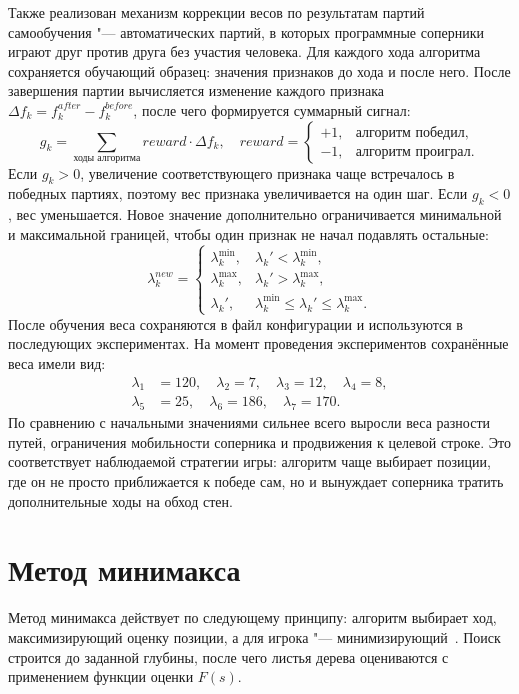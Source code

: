 \documentclass{csmathnotes}
\begin{document}
Также реализован механизм коррекции весов по результатам партий самообучения "--- автоматических партий, в которых программные соперники играют друг против друга без участия человека. Для каждого хода алгоритма сохраняется обучающий образец: значения признаков до хода и после него. После завершения партии вычисляется изменение каждого признака $\Delta f_k = f_k^{\textit{after}} - f_k^{\textit{before}}$, после чего формируется суммарный сигнал:
\[
g_k = \sum_{\text{ходы алгоритма}} \textit{reward} \cdot \Delta f_k,
\quad
\textit{reward} =
\begin{cases}
+1, & \text{алгоритм победил}, \\
-1, & \text{алгоритм проиграл}.
\end{cases}
\]
Если $g_k > 0$, увеличение соответствующего признака чаще встречалось в победных партиях, поэтому вес признака увеличивается на один шаг. Если $g_k < 0$, вес уменьшается. Новое значение дополнительно ограничивается минимальной и максимальной границей, чтобы один признак не начал подавлять остальные:
\[
\lambda_k^{\textit{new}} =
\begin{cases}
\lambda_k^{\min}, & \lambda_k' < \lambda_k^{\min}, \\
\lambda_k^{\max}, & \lambda_k' > \lambda_k^{\max}, \\
\lambda_k', & \lambda_k^{\min} \le \lambda_k' \le \lambda_k^{\max}.
\end{cases}
\]
После обучения веса сохраняются в файл конфигурации и используются в последующих экспериментах. На момент проведения экспериментов сохранённые веса имели вид:
\[
\begin{aligned}
\lambda_1 &= 120,\quad
\lambda_2 = 7,\quad
\lambda_3 = 12,\quad
\lambda_4 = 8,\\
\lambda_5 &= 25,\quad
\lambda_6 = 186,\quad
\lambda_7 = 170.
\end{aligned}
\]
По сравнению с начальными значениями сильнее всего выросли веса разности путей, ограничения мобильности соперника и продвижения к целевой строке. Это соответствует наблюдаемой стратегии игры: алгоритм чаще выбирает позиции, где он не просто приближается к победе сам, но и вынуждает соперника тратить дополнительные ходы на обход стен.

\section*{Метод минимакса}

Метод минимакса действует по следующему принципу: алгоритм выбирает ход, максимизирующий оценку позиции, а для игрока "--- минимизирующий~\cite{Russell:2021}. Поиск строится до заданной глубины, после чего листья дерева оцениваются с применением функции оценки $F(s)$.
\end{document}
